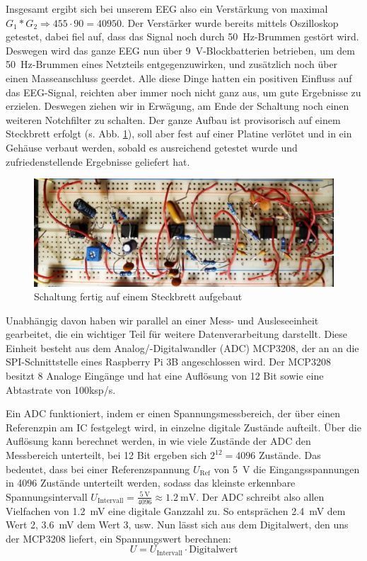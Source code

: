 \documentclass[10pt]{article}
\begin{document}
Insgesamt ergibt sich bei unserem EEG also ein Verstärkung von maximal $G_1 * G_2  \Rightarrow 455 \cdot 90 = 40950$.
Der Verstärker wurde bereits mittels Oszilloskop getestet, dabei fiel auf, dass das Signal noch durch \SI{50}{\hertz}-Brummen gestört wird.
Deswegen wird das ganze EEG nun über \SI{9}{\volt}-Blockbatterien betrieben, um dem \SI{50}{\hertz}-Brummen eines Netzteils entgegenzuwirken, und zusätzlich noch über einen Masseanschluss geerdet. Alle diese Dinge hatten ein positiven Einfluss auf das EEG-Signal, reichten aber immer noch nicht ganz aus, um gute Ergebnisse zu erzielen.
Deswegen ziehen wir in Erwägung, am Ende der Schaltung noch einen weiteren Notchfilter zu schalten. 
Der ganze Aufbau ist provisorisch auf einem Steckbrett erfolgt (s. Abb. \ref{fig:Schaltung}), soll aber fest auf einer Platine verlötet und in ein Gehäuse verbaut werden, sobald es ausreichend getestet wurde und zufriedenstellende Ergebnisse geliefert hat.
 \begin{figure}[h!]
    \centering
    \includegraphics[width=0.5\linewidth]{pictures/Schaltung_cropped.jpeg}
    \caption{Schaltung fertig auf einem Steckbrett aufgebaut}
    \label{fig:Schaltung}
\end{figure}
Unabhängig davon haben wir parallel an einer Mess- und Ausleseeinheit gearbeitet, die ein wichtiger Teil für weitere Datenverarbeitung darstellt. 
Diese Einheit besteht aus dem Analog/-Digitalwandler (ADC) MCP3208, der an an die SPI-Schnittstelle eines Raspberry Pi 3B angeschlossen wird.
Der MCP3208 besitzt 8 Analoge Eingänge und hat eine Auflösung von 12 Bit sowie eine Abtastrate von 100ksp/s. \cite{ADC}

Ein ADC funktioniert, indem er einen Spannungsmessbereich, der über einen Referenzpin am IC festgelegt wird, in einzelne digitale Zustände aufteilt. 
Über die Auflösung kann berechnet werden, in wie viele Zustände der ADC den Messbereich unterteilt, bei 12 Bit ergeben sich $2^{12}=4096$ Zustände. 
Das bedeutet, dass bei einer Referenzspannung $U_\textrm{Ref}$ von \SI{5}{\volt} die Eingangsspannungen in 4096 Zustände unterteilt werden, sodass das kleinste erkennbare Spannungsintervall $U_\textrm{Intervall} = \frac{\SI{5}{\volt}}{4096} \approx \SI{1.2}{\milli\volt}$.
Der ADC schreibt also allen Vielfachen von \SI{1.2}{\milli\volt} eine digitale Ganzzahl zu. 
So entsprächen \SI{2.4}{\milli\volt} dem Wert 2, \SI{3.6}{\milli\volt} dem Wert 3, usw. 
Nun lässt sich aus dem Digitalwert, den uns der MCP3208 liefert, ein Spannungswert berechnen:
%
\[
    U = U_\textrm{Intervall} \cdot \textrm{Digitalwert}
\]
\end{document}
